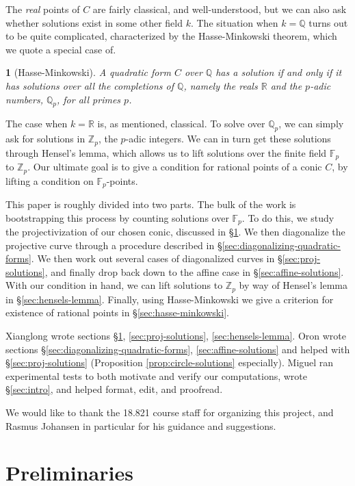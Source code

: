 \documentclass[10pt,a4paper]{amsart}
\numberwithin{equation}{section}
\numberwithin{figure}{section}
\theoremstyle{definition}
\theoremstyle{remark}
\theoremstyle{plain}
\newtheorem{thm}{\protect\theoremname}[section]
\theoremstyle{plain}
\theoremstyle{definition}
\theoremstyle{plain}
\theoremstyle{plain}
\providecommand{\theoremname}{Theorem}
\newcommand{\F}{\mathbb{F}}
\newcommand{\Z}{\mathbb{Z}}
\newcommand{\Q}{\mathbb{Q}}
\newcommand{\R}{\mathbb{R}}
\begin{document}
	The \emph{real} points of $C$ are fairly classical, and well-understood,
	but we can also ask whether solutions exist in some other
	field $k$. The situation when $k=\Q$ turns out to be quite complicated,
	characterized by the Hasse-Minkowski theorem, which we quote a special
	case of.
	\begin{thm}[Hasse-Minkowski]
		A quadratic form $C$ over $\Q$ has a solution if and only if it has solutions
		over all the completions of $\Q$, namely the reals $\R$ and the $p$-adic
		numbers, $\Q_p$, for all primes $p$.
	\end{thm}
	The case when $k = \R$ is, as mentioned, classical. To solve over $\Q_p$,
	we can simply ask for solutions in $\Z_p$, the $p$-adic integers. We
	can in turn get these solutions through Hensel's lemma, which allows us
	to lift solutions over the finite field $\F_p$ to $\Z_p$. Our ultimate
	goal is to give a condition for rational points of a conic $C$, by lifting
	a condition on $\F_p$-points.
	
	This paper is roughly divided into two parts. The bulk of the work 
	is bootstrapping this process by counting solutions over $\F_p$. To do this,
	we study the projectivization of our chosen conic, discussed in
	\S\ref{sec:projectivization-of-the-problem}. We then diagonalize 
	the projective curve through a procedure described in 
	\S\ref{sec:diagonalizing-quadratic-forms}. We then work out several cases
	of diagonalized curves in \S\ref{sec:proj-solutions}, and finally
	drop back down to the affine case in \S\ref{sec:affine-solutions}.
	With our condition in hand, we can lift solutions to $\Z_p$ by way of
	Hensel's lemma in \S\ref{sec:hensels-lemma}. Finally, using Hasse-Minkowski we give a criterion for 
	existence of rational points in 
	\S\ref{sec:hasse-minkowski}.

	Xianglong wrote sections \S\ref{sec:projectivization-of-the-problem}, \ref{sec:proj-solutions}, \ref{sec:hensels-lemma}. Oron wrote sections \S\ref{sec:diagonalizing-quadratic-forms}, \ref{sec:affine-solutions} and helped with \S\ref{sec:proj-solutions} (Proposition \ref{prop:circle-solutions} especially). Miguel ran experimental tests to both motivate and verify our computations, wrote \S\ref{sec:intro}, and helped format, edit, and proofread.
	
	We would like to thank the 18.821 course staff for organizing this project, and Rasmus Johansen in particular for his guidance and suggestions.    
    \section{Preliminaries}\label{sec:projectivization-of-the-problem}
\end{document}
